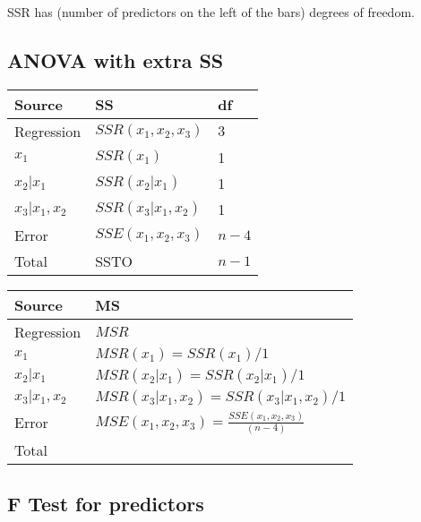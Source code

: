 \documentclass[10pt]{article}
\begin{document}
\begin{multicols}{3}
    SSR has (number of predictors on the left of the bars) degrees of freedom.

    \subsection{ANOVA with extra SS}

    \begin{center}
        \begin{tabular}{l l l}
            Source         & SS                  & df      \\ \hline
            Regression     & $SSR(x_1,x_2,x_3)$  & $3$     \\
            $x_1$          & $SSR(x_1)$          & 1       \\
            $x_2|x_1$      & $SSR(x_2|x_1)$      & 1       \\
            $x_3|x_1, x_2$ & $SSR(x_3|x_1, x_2)$ & 1       \\
            Error          & $SSE(x_1,x_2,x_3)$  & $n - 4$ \\
            Total          & SSTO                & $n - 1$ \\
        \end{tabular}
    \end{center}

    \begin{center}
        \begin{tabular}{l l}
            Source         & MS                                                   \\ \hline
            Regression     & $MSR$                                                \\
            $x_1$          & $MSR(x_1) = SSR(x_1)/1$                              \\
            $x_2|x_1$      & $MSR(x_2|x_1) = SSR(x_2|x_1)/1$                      \\
            $x_3|x_1, x_2$ & $MSR(x_3|x_1,x_2) = SSR(x_3|x_1,x_2)/1$              \\
            Error          & $MSE(x_1, x_2,x_3) = \frac{SSE(x_1,x_2,x_3)}{(n-4)}$ \\
            Total          &                                                      \\
        \end{tabular}
    \end{center}

    \subsection{F Test for predictors}


\end{multicols}
\end{document}
